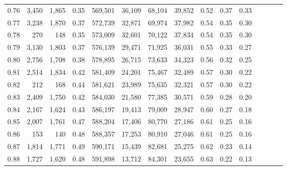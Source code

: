\begin{tabular}{rrrcrrrrrrrrrrr}
0.76 &   3,450 &   1,865 &                                       0.35 &  569,501 &   36,109 &   68,104 &   39,852 &  0.52 &  0.37 &                         0.33 \\
0.77 &   3,238 &   1,870 &                                       0.37 &  572,739 &   32,871 &   69,974 &   37,982 &  0.54 &  0.35 &                         0.30 \\
0.78 &     270 &     148 &                                       0.35 &  573,009 &   32,601 &   70,122 &   37,834 &  0.54 &  0.35 &                         0.30 \\
0.79 &   3,130 &   1,803 &                                       0.37 &  576,139 &   29,471 &   71,925 &   36,031 &  0.55 &  0.33 &                         0.27 \\
0.80 &   2,756 &   1,708 &                                       0.38 &  578,895 &   26,715 &   73,633 &   34,323 &  0.56 &  0.32 &                         0.25 \\
0.81 &   2,514 &   1,834 &                                       0.42 &  581,409 &   24,201 &   75,467 &   32,489 &  0.57 &  0.30 &                         0.22 \\
0.82 &     212 &     168 &                                       0.44 &  581,621 &   23,989 &   75,635 &   32,321 &  0.57 &  0.30 &                         0.22 \\
0.83 &   2,409 &   1,750 &                                       0.42 &  584,030 &   21,580 &   77,385 &   30,571 &  0.59 &  0.28 &                         0.20 \\
0.84 &   2,167 &   1,624 &                                       0.43 &  586,197 &   19,413 &   79,009 &   28,947 &  0.60 &  0.27 &                         0.18 \\
0.85 &   2,007 &   1,761 &                                       0.47 &  588,204 &   17,406 &   80,770 &   27,186 &  0.61 &  0.25 &                         0.16 \\
0.86 &     153 &     140 &                                       0.48 &  588,357 &   17,253 &   80,910 &   27,046 &  0.61 &  0.25 &                         0.16 \\
0.87 &   1,814 &   1,771 &                                       0.49 &  590,171 &   15,439 &   82,681 &   25,275 &  0.62 &  0.23 &                         0.14 \\
0.88 &   1,727 &   1,620 &                                       0.48 &  591,898 &   13,712 &   84,301 &   23,655 &  0.63 &  0.22 &                         0.13 \\

\end{tabular}
